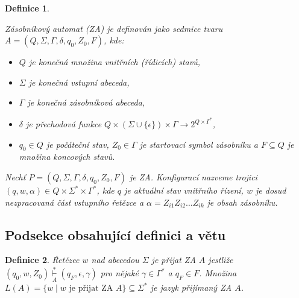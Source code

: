 \documentclass[a4paper, twocolumn, 11pt]{article}
\theoremstyle{plain}
\newtheorem{definition}{Definice}
\begin{document}
\begin{definition}
	\label{def:automat}

	\emph{Zásobníkový automat} (ZA) je definován jako sedmice tvaru
	$A = (Q, \Sigma, \Gamma, \delta, q_0, Z_0, F)$, kde:

	\begin{itemize}

		\item $Q$ je konečná množina \emph{vnitřních (řídicích) stavů},

		\item $\Sigma$ je konečná \emph{vstupní abeceda},

		\item $\Gamma$ je konečná \emph{zásobníková abeceda},

		\item $\delta$ je \emph{přechodová funkce}
		      $Q \times \left( \Sigma \cup \{ \epsilon \} \right) \times
			      \Gamma \rightarrow 2^{Q \times \Gamma^\ast} $,

		\item $q_0 \in Q$ je \emph{počáteční stav},
		      $Z_0 \in \Gamma$ je \emph{startovací symbol zásobníku}
		      a $F \subseteq Q$ je množina \emph{koncových stavů}.

	\end{itemize}

	\normalfont{}
	Nechť $P = (Q, \Sigma, \Gamma, \delta, q_0, Z_0, F)$ je ZA.
	\emph{Konfigurací} nazveme trojici
	$(q, w, \alpha) \in Q \times \Sigma^\ast \times \Gamma^\ast$, kde
	$q$ je aktuální stav vnitřního řízení,
	$w$ je dosud nezpracovaná část vstupního řetězce
	a $\alpha = Z_{i1} Z_{i2} \ldots Z_{ik}$ je obsah zásobníku.

\end{definition}

\subsection{Podsekce obsahující definici a větu}

\begin{definition}

	\emph{Řetězec $w$ nad abecedou $\Sigma$ je přijat ZA} $A$ jestliže
	${(q_0, w, Z_0) \underset{A}{\overset{*}{\vdash}} (q_F, \epsilon, \gamma)}$ pro nějaké
	${\gamma \in \Gamma^\ast}$ a ${q_F \in F}$.
	Množina $L(A) = \{ w \mid w \text{ je přijat ZA } A \} \subseteq \Sigma^\ast$
	je \emph{jazyk přijímaný ZA} $A$.

\end{definition}
\end{document}
